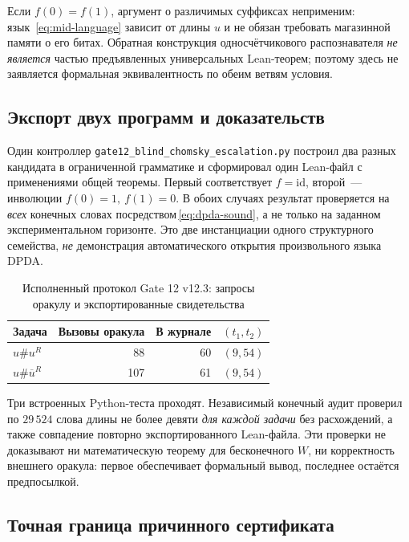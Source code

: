 \documentclass[11pt,a4paper]{article}
\begin{document}
Если $f(0)=f(1)$, аргумент о различимых суффиксах неприменим: язык~\eqref{eq:mid-language} зависит от длины $u$ и не обязан требовать магазинной памяти о его битах. Обратная конструкция односчётчикового распознавателя \emph{не является} частью предъявленных универсальных Lean-теорем; поэтому здесь не заявляется формальная эквивалентность по обеим ветвям условия.

\subsection{Экспорт двух программ и доказательств}

Один контроллер \texttt{gate12\_blind\_chomsky\_escalation.py} построил два разных кандидата в ограниченной грамматике и сформировал один Lean-файл с применениями общей теоремы. Первый соответствует $f=\mathrm{id}$, второй~--- инволюции $f(0)=1,\ f(1)=0$. В обоих случаях результат проверяется на \emph{всех} конечных словах посредством\,\eqref{eq:dpda-sound}, а не только на заданном экспериментальном горизонте. Это две инстанциации одного структурного семейства, \emph{не} демонстрация автоматического открытия произвольного языка DPDA.

\begin{table}[htbp]
\centering\small
\caption{Исполненный протокол Gate 12 v12.3: запросы оракулу и экспортированные свидетельства}\label{tab:gate12}
\renewcommand{\arraystretch}{1.15}
\begin{tabularx}{\linewidth}{@{}>{\raggedright\arraybackslash}Xrrr@{}}
\toprule
\textbf{Задача} & \textbf{Вызовы оракула} & \textbf{В журнале} & \textbf{$(t_1,t_2)$}\\
\midrule
$u\#u^R$ & 88 & 60 & $(9,54)$\\
$u\#\overline{u}^R$ & 107 & 61 & $(9,54)$\\
\bottomrule
\end{tabularx}
\end{table}

Три встроенных Python-теста проходят. Независимый конечный аудит проверил по $29\,524$ слова длины не более девяти \emph{для каждой задачи} без расхождений, а также совпадение повторно экспортированного Lean-файла. Эти проверки не доказывают ни математическую теорему для бесконечного $W$, ни корректность внешнего оракула: первое обеспечивает формальный вывод, последнее остаётся предпосылкой.

\subsection{Точная граница причинного сертификата}
\end{document}
